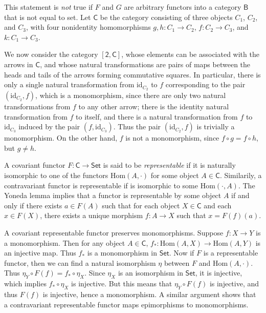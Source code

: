 \begin{remark}
    This statement is \emph{not} true if $F$ and $G$ are arbitrary functors into a category $\mathsf{B}$ that is not equal to set. Let $\mathsf{C}$ be the category consisting of three objects $C_1$, $C_2$, and $C_3$, with four nonidentity homomorphisms $g,h: C_1 \to C_2$, $f: C_2 \to C_3$, and $k: C_1 \to C_3$. 
    \begin{center}
    \end{center}
    We now consider the category $[\mathsf{2}, \mathsf{C}]$, whose elements can be associated with the arrows in $\mathsf{C}$, and whose natural transformations are pairs of maps between the heads and tails of the arrows forming commutative squares. In particular, there is only a single natural transformation from $\text{id}_{C_2}$ to $f$ corresponding to the pair $(\text{id}_{C_2}, f)$, which is a monomorphism, since there are only two natural transformations from $f$ to any other arrow; there is the identity natural transformation from $f$ to itself, and there is a natural transformation from $f$ to $\text{id}_{C_3}$ induced by the pair $(f,\text{id}_{C_3})$. Thus the pair $(\text{id}_{C_2},f)$ is trivially a monomorphism. On the other hand, $f$ is not a monomorphism, since $f \circ g = f \circ h$, but $g \neq h$.
\end{remark}

A covariant functor $F: \mathsf{C} \to \mathsf{Set}$ is said to be \emph{representable} if it is naturally isomorphic to one of the functors $\text{Hom}(A,\cdot)$ for some object $A \in \mathsf{C}$. Similarily, a contravariant functor is representable if is isomorphic to some $\text{Hom}(\cdot,A)$. The Yoneda lemma implies that a functor is representable by some object $A$ if and only if there exists $a \in F(A)$ such that for each object $X \in \mathsf{C}$ and each $x \in F(X)$, there exists a unique morphism $f: A \to X$ such that $x = F(f)(a)$.

A covariant representable functor preserves monomorphisms. Suppose $f: X \to Y$ is a monomorphism. Then for any object $A \in \mathsf{C}$, $f_*: \text{Hom}(A,X) \to \text{Hom}(A,Y)$ is an injective map. Thus $f_*$ is a monomorphism in $\mathsf{Set}$. Now if $F$ is a representable functor, then we can find a natural isomorphism $\eta$ between $F$ and $\text{Hom}(A,\cdot)$. Thus $\eta_Y \circ F(f) = f_* \circ \eta_X$. Since $\eta_X$ is an isomorphism in $\mathsf{Set}$, it is injective, which implies $f_* \circ \eta_X$ is injective. But this means that $\eta_Y \circ F(f)$ is injective, and thus $F(f)$ is injective, hence a monomorphism. A similar argument shows that a contravariant representable functor maps epimorphisms to monomorphisms.

